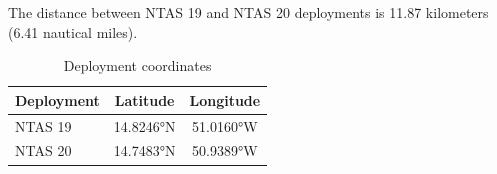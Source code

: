 
The distance between NTAS 19 and NTAS 20 deployments is 11.87 kilometers (6.41 nautical miles).

\begin{table}[ht]
\centering
\caption{Deployment coordinates}
\begin{tabular}{lcc}
\hline
\textbf{Deployment} & \textbf{Latitude} & \textbf{Longitude} \\
\hline
NTAS 19 & 14.8246°N & 51.0160°W \\
NTAS 20 & 14.7483°N & 50.9389°W \\
\hline
\end{tabular}
\end{table}
